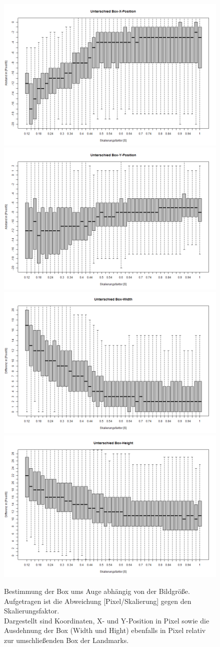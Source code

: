 \begin{figure}
	\centering
	\includegraphics[width=0.49\linewidth]{Eye_Img_Box/Openface_BoxX}
	\includegraphics[width=0.49\linewidth]{Eye_Img_Box/Openface_BoxY}\\
	\includegraphics[width=0.49\linewidth]{Eye_Img_Box/Openface_BoxW}
	\includegraphics[width=0.49\linewidth]{Eye_Img_Box/Openface_BoxH}
	\caption{Bestimmung der Box ums Auge abhängig von der Bildgröße. Aufgetragen ist die Abweichung [Pixel/Skalierung] gegen den Skalierungsfaktor.\\
		Dargestellt sind Koordinaten, X- und Y-Position in Pixel sowie die Ausdehnung der Box (Width und Hight) ebenfalls in Pixel relativ zur umschließenden Box der Landmarks.}
	\label{OpenFace_Eye_Box}
\end{figure}

